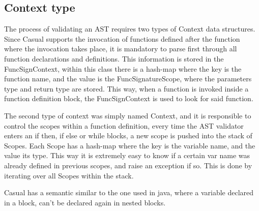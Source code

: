 \documentclass[12pt]{article}
\begin{document}
\newpage

\subsection{Context type}
The process of validating an AST requires two types of Context data structures. Since Casual supports the invocation of functions defined after the function where the invocation takes place, it is mandatory to parse first through all function declarations and definitions. This information is stored in the FuncSignContext, within this class there is a hash-map where the key is the function name, and the value is the FuncSignatureScope, where the parameters type and return type are stored. This way, when a function is invoked inside a function definition block, the FuncSignContext is used to look for said function.

The second type of context was simply named Context, and it is responsible to control the scopes within a function definition, every time the AST validator enters an if then, if else or while blocks, a new scope is pushed into the stack of Scopes. Each Scope has a hash-map where the key is the variable name, and the value its type. This way it is extremely easy to know if a certain var name was already defined in previous scopes, and raise an exception if so. This is done by iterating over all Scopes within the stack.

Casual has a semantic similar to the one used in java, where a variable declared in a block, can't be declared again in nested blocks.


\end{document}
